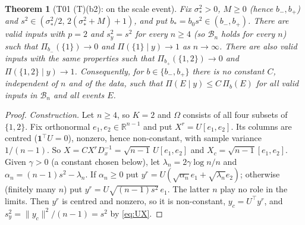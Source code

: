 \documentclass[11pt]{article}
\newtheorem{theorem}{Theorem}[section]
\theoremstyle{remark}
\newcommand{\R}{\mathbb R}
\newcommand{\tr}{^{\top}}
\newcommand{\Om}{\Omega}
\newcommand{\B}{\mathcal B}
\newcommand{\sy}{s_y}
\newcommand{\yc}{y_c}
\newcommand{\Xc}{X_c}
\newcommand{\bm}{b_-}
\newcommand{\bp}{b_+}
\begin{document}
\begin{theorem}[T01 (T)(b2): on the scale event]\label{thm:Tb}
Fix $\sigma_*^2>0$, $M\ge0$ (hence $\bm,\bp$) and $s^2\in(\sigma_*^2/2,\,2(\sigma_*^2+M)+1)$, and put $b_*=b_0s^2\in(\bm,\bp)$. There are valid inputs with $p=2$ and $\sy^2=s^2$ for every $n\ge4$ (so $\B_n$ holds for every $n$) such that $\Pi_{\bm}(\{1\})\to0$ and $\Pi(\{1\}\mid y)\to1$ as $n\to\infty$. There are also valid inputs with the same properties such that $\Pi_{\bp}(\{1,2\})\to0$ and $\Pi(\{1,2\}\mid y)\to1$. Consequently, for $b\in\{\bm,\bp\}$ there is no constant $C$, independent of $n$ and of the data, such that $\Pi(E\mid y)\le C\,\Pi_b(E)$ for all valid inputs in $\B_n$ and all events $E$.
\end{theorem}
\begin{proof}
\emph{Construction.} Let $n\ge4$, so $K=2$ and $\Om$ consists of all four subsets of $\{1,2\}$. Fix orthonormal $e_1,e_2\in\R^{n-1}$ and put $X^r=U[e_1,e_2]$. Its columns are centred ($\mathbf 1\tr U=0$), nonzero, hence non-constant, with sample variance $1/(n-1)$. So $X=CX^rD_x^{-1}=\sqrt{n-1}\,U[e_1,e_2]$ and $\Xc=\sqrt{n-1}[e_1,e_2]$. Given $\gamma>0$ (a constant chosen below), let $\lambda_n=2\gamma\log n/n$ and $\alpha_n=(n-1)s^2-\lambda_n$. If $\alpha_n\ge0$ put $y^r=U(\sqrt{\alpha_n}e_1+\sqrt{\lambda_n}e_2)$; otherwise (finitely many $n$) put $y^r=U\sqrt{(n-1)s^2}\,e_1$. The latter $n$ play no role in the limits. Then $y^r$ is centred and nonzero, so it is non-constant, $\yc=U\tr y^r$, and $\sy^2=\|\yc\|^2/(n-1)=s^2$ by \eqref{eq:UX}.


\end{proof}
\end{document}
